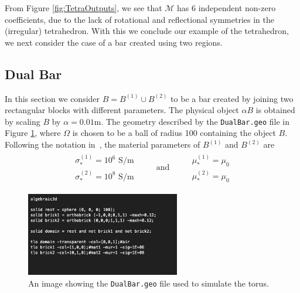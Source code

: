 \noindent
From Figure \ref{fig:TetraOutputs},  we see that $\mathcal{M}$ has 6 independent non-zero coefficients, due to the lack of rotational and reflectional symmetries in the (irregular) tetrahedron. With this we conclude our example of the tetrahedron, we next consider the case of a bar created using two regions.
\subsection{Dual Bar}
In this section we consider $B =B^{(1)} \cup B^{(2)}$  to be a bar created by joining two  rectangular blocks with different parameters. The physical object $\alpha B$ is obtained by scaling $B$ by $\alpha=0.01\text{m}$. The geometry described by the \texttt{DualBar.geo} file in Figure \ref{fig:DualBar.geo}, where $\Omega$ is chosen to be a ball of radius 100 containing the object $B$. Following the notation in~\cite{LedgerLionheartamad2019}, the material parameters of $B^{(1)}$ and $ B^{(2)}$  are
\begin{align*}
\begin{array}{l}
\sigma_*^{(1)}= 10^6\text{ S/m} \\
\sigma_*^{(2)}=10^8\text{ S/m}
\end{array} \qquad  \text{ and } \qquad
\begin{array}{l}
\mu_* ^{(1)}=
\mu_0\\
\mu_* ^{(2)}=\mu_0
\end{array}
\end{align*}
\begin{figure}[H]
\begin{center}
\includegraphics[width=0.6\textwidth]{Figures/DualBarInput.png}
\caption{An image showing the \texttt{DualBar.geo} file used to simulate the torus.}\label{fig:DualBar.geo}
\end{center}
\end{figure}
\noindent


